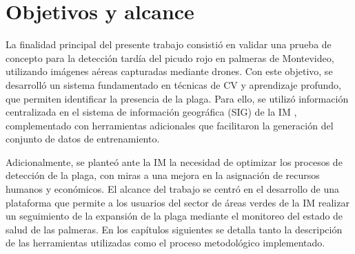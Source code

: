 
\section{Objetivos y alcance}
\label{sec:objetivos}

La finalidad principal del presente trabajo consistió en validar una prueba de concepto para la detección tardía del picudo rojo en palmeras de Montevideo, utilizando imágenes aéreas capturadas mediante drones. Con este objetivo, se desarrolló un sistema fundamentado en técnicas de CV y aprendizaje profundo, que permiten identificar la presencia de la plaga. Para ello, se utilizó información centralizada en el sistema de información geográfica (SIG) de la IM \citep{intendencia_de_montevideo_sistema_nodate}, complementado con herramientas adicionales que facilitaron la generación del conjunto de datos de entrenamiento.

Adicionalmente, se planteó ante la IM la necesidad de optimizar los procesos de detección de la plaga, con miras a una mejora en la asignación de recursos humanos y económicos. El alcance del trabajo se centró en el desarrollo de una plataforma que permite a los usuarios del sector de áreas verdes de la IM realizar un seguimiento de la expansión de la plaga mediante el monitoreo del estado de salud de las palmeras. En los capítulos siguientes se detalla tanto la descripción de las herramientas utilizadas como el proceso metodológico implementado.